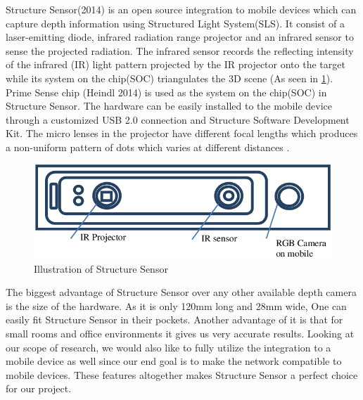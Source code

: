 Structure Sensor(2014) is an open source integration to mobile devices which can capture depth information using Structured Light System(SLS). It consist of a laser-emitting diode, infrared radiation range projector and an infrared sensor to sense the projected radiation. The infrared sensor records the reflecting intensity of the infrared (IR) light pattern projected by the IR projector onto the target while its system on the chip(SOC) triangulates the 3D scene \cite{Kalantari}(As seen in \ref{fig:Structuresensor}). Prime Sense chip (Heindl 2014) is used as the system on the chip(SOC) in Structure Sensor. The hardware can be easily installed to the mobile device through a customized USB 2.0 connection and Structure Software Development Kit. The micro lenses in the projector have different focal lengths which produces a non-uniform pattern of dots which varies at different distances \cite{Kalantari}. \\


\begin{figure}[h]
\centering
    \includegraphics[scale=0.29]{Figures/illustration-of-structure-sensor.png}
    \caption{Illustration of Structure Sensor}
    \label{fig:Structuresensor}
\end{figure}

The biggest advantage of Structure Sensor over any other available depth camera is the size of the hardware. As it is only 120mm long and 28mm wide, One can easily fit Structure Sensor in their pockets. Another advantage of it is that for small rooms and office environments it gives us very accurate results. Looking at our scope of research, we would also like to fully utilize the integration to a mobile device as well since our end goal is to make the network compatible to mobile devices. These features altogether makes Structure Sensor a perfect choice for our project.\\